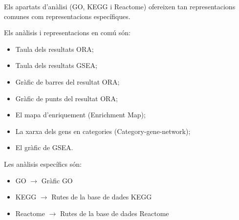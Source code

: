 Els apartats d'anàlisi (GO, KEGG i Reactome) ofereixen tan representacions comunes com representacions específiques. 

Els anàlisis i representacions en comú són:

\begin{itemize}
\item Taula dels resultats ORA;
\item Taula dels resultats GSEA;
\item Gràfic de barres del resultat ORA;
\item Gràfic de punts del resultat ORA;
\item El mapa d'enriquement (Enrichment Map);
\item La xarxa dels gens en categories (Category-gene-network);
\item El gràfic de GSEA.
\end{itemize} 

Les anàlisis específics són:

\begin{itemize}
\item GO $\rightarrow$ Gràfic GO 
\item KEGG $\rightarrow$ Rutes de la base de dades KEGG
\item Reactome $\rightarrow$ Rutes de la base de dades Reactome
\end{itemize}

